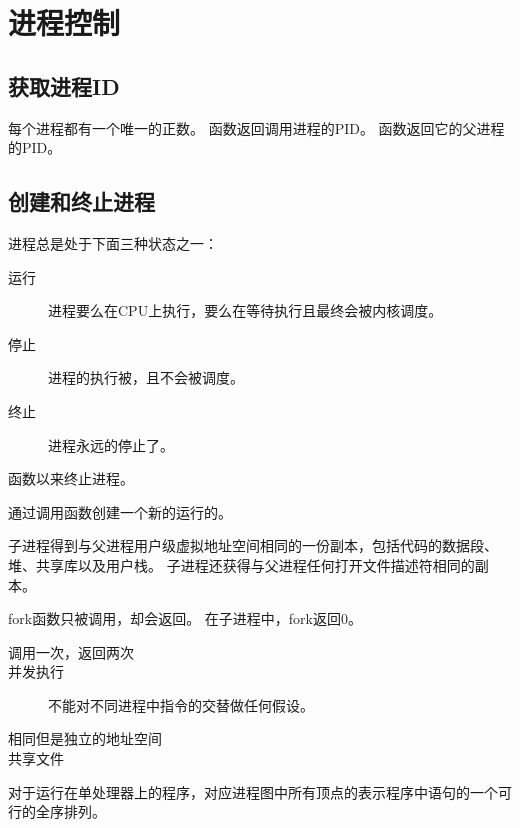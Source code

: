 
\section{进程控制}
{
    \subsection{获取进程ID}
    {
        每个进程都有一个唯一的正数。
        函数返回调用进程的PID。
        函数返回它的父进程的PID。
    }

    \subsection{创建和终止进程}
    {
        进程总是处于下面三种状态之一：

        \begin{description}
            \item[运行] 进程要么在CPU上执行，要么在等待执行且最终会被内核调度。
            \item[停止] 进程的执行被，且不会被调度。
            \item[终止] 进程永远的停止了。
        \end{description}

        函数以来终止进程。

        通过调用函数创建一个新的运行的。

        子进程得到与父进程用户级虚拟地址空间相同的一份副本，包括代码的数据段、堆、共享库以及用户栈。
        子进程还获得与父进程任何打开文件描述符相同的副本。

        fork函数只被调用，却会返回。
        在子进程中，fork返回0。

        \begin{description}
            \item[调用一次，返回两次]
            \item[并发执行] 不能对不同进程中指令的交替做任何假设。
            \item[相同但是独立的地址空间]
            \item[共享文件]
        \end{description}

        对于运行在单处理器上的程序，对应进程图中所有顶点的表示程序中语句的一个可行的全序排列。

}}
